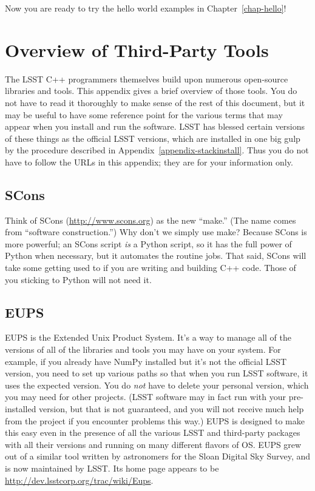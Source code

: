 \documentclass{book}
\begin{document}
Now you are ready to try the hello world examples in
Chapter~\ref{chap-hello}! 


\chapter{Overview of Third-Party Tools\label{appendix-thirdparty}}

The LSST C++ programmers themselves build upon numerous open-source
libraries and tools.  This appendix gives a brief overview of those
tools.  You do not have to read it thoroughly to make sense of the
rest of this document, but it may be useful to have some reference
point for the various terms that may appear when you install and run
the software.  LSST has blessed certain versions of these things as
the official LSST versions, which are installed in one big gulp by the
procedure described in Appendix~\ref{appendix-stackinstall}.  Thus you
do not have to follow the URLs in this appendix; they are for your
information only.

\section{SCons}

Think of SCons (\url{http://www.scons.org}) as the new ``make.''  (The
name comes from ``software construction.'')  Why don't we simply use
make?  Because SCons is more powerful; an SCons script {\it is} a
Python script, so it has the full power of Python when necessary, but
it automates the routine jobs.  That said, SCons will take some
getting used to if you are writing and building C++ code.  Those of
you sticking to Python will not need it.

\section{EUPS}

EUPS is the Extended Unix Product System.  It's a way to manage all of
the versions of all of the libraries and tools you may have on your
system.  For example, if you already have NumPy installed but it's not
the official LSST version, you need to set up various paths so that
when you run LSST software, it uses the expected version.  You do {\it
  not} have to delete your personal version, which you may need for
other projects.  (LSST software may in fact run with your
pre-installed version, but that is not guaranteed, and you will not
receive much help from the project if you encounter problems this
way.)  EUPS is designed to make this easy even in the presence of all
the various LSST and third-party packages with all their versions and
running on many different flavors of OS.  EUPS grew out of a similar
tool written by astronomers for the Sloan Digital Sky Survey, and is
now maintained by LSST.  Its home page appears to be
\url{http://dev.lsstcorp.org/trac/wiki/Eups}.
\end{document}
